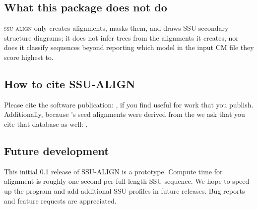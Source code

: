 \subsection{What this package does not do}

\textsc{ssu-align} only creates alignments, masks them, and draws SSU
secondary structure diagrams; it does not infer trees from the
alignments it creates, nor does it classify sequences beyond reporting
which model in the input CM file they score highest to.

\subsection{How to cite SSU-ALIGN}

Please cite the  software publication:
\cite{Nawrocki09}, if you find  useful for work that
you publish. Additionally, because 's seed alignments were
derived from the  we ask that you cite
that database as well: \cite{CannoneGutell02}. 

\subsection{Future development}

This initial 0.1 release of \textsc{SSU-ALIGN} is a prototype. 
Compute time for alignment is roughly one second per full length SSU
sequence. We hope to speed up the program and add additional SSU
profiles in future releases. Bug reports and feature requests are
appreciated.
